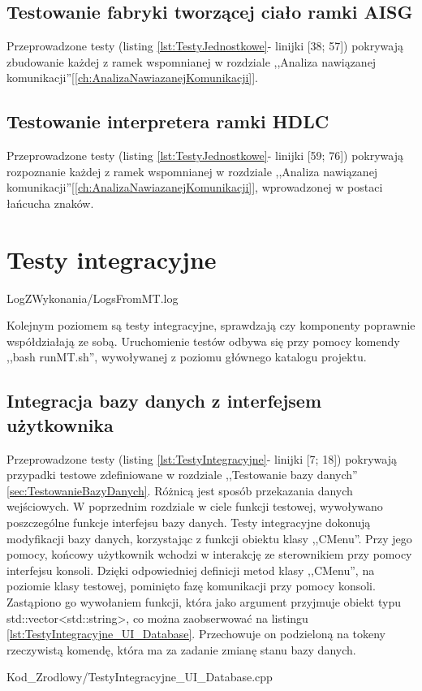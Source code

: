     \subsection{Testowanie fabryki tworzącej ciało ramki AISG}
        Przeprowadzone testy (listing \ref{lst:TestyJednostkowe}- linijki [38; 57]) pokrywają zbudowanie każdej z ramek
        wspomnianej w rozdziale ,,Analiza nawiązanej komunikacji''[\ref{ch:AnalizaNawiazanejKomunikacji}].
    \subsection{Testowanie interpretera ramki HDLC}
        Przeprowadzone testy (listing \ref{lst:TestyJednostkowe}- linijki [59; 76]) pokrywają rozpoznanie każdej z ramek 
        wspomnianej w rozdziale ,,Analiza nawiązanej komunikacji''[\ref{ch:AnalizaNawiazanejKomunikacji}], wprowadzonej w postaci łańcucha znaków.


\section{Testy integracyjne}
    
    {LogZWykonania/LogsFromMT.log}
    
    Kolejnym poziomem są testy integracyjne, sprawdzają czy komponenty poprawnie współdziałają ze sobą\cite{Testowanie}. 
    Uruchomienie testów odbywa się przy pomocy komendy ,,bash runMT.sh'', wywoływanej z poziomu głównego katalogu projektu.
    
    \subsection{Integracja bazy danych z interfejsem użytkownika}
    Przeprowadzone testy (listing \ref{lst:TestyIntegracyjne}- linijki [7; 18]) pokrywają przypadki testowe zdefiniowane w rozdziale ,,Testowanie bazy danych''
    \ref{sec:TestowanieBazyDanych}.
    Różnicą jest sposób przekazania danych wejściowych. W poprzednim rozdziale w ciele funkcji testowej, wywoływano poszczególne funkcje interfejsu bazy danych.
    Testy integracyjne dokonują modyfikacji bazy danych, korzystając z funkcji obiektu klasy ,,CMenu''. Przy jego pomocy, końcowy użytkownik wchodzi w interakcję ze sterownikiem  
    przy pomocy interfejsu konsoli. Dzięki odpowiedniej definicji metod klasy ,,CMenu'', na poziomie klasy testowej, pominięto fazę komunikacji przy pomocy konsoli.
    Zastąpiono go wywołaniem funkcji, która jako argument przyjmuje obiekt typu std::vector<std::string>, co można zaobserwować na listingu
    \ref{lst:TestyIntegracyjne_UI_Database}. Przechowuje on podzieloną na tokeny rzeczywistą komendę, która ma za zadanie zmianę stanu bazy danych.
    
        {Kod_Zrodlowy/TestyIntegracyjne_UI_Database.cpp}

